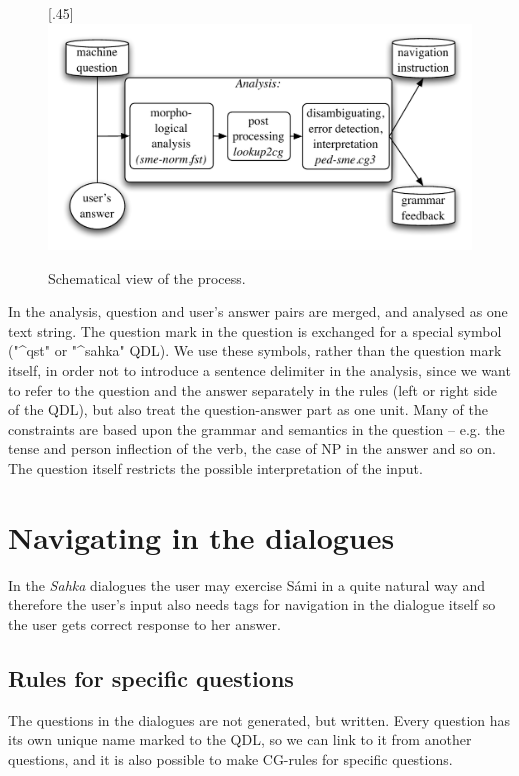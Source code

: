 \documentclass[11pt]{article}
\begin{document}
\begin{figure}[htbp]
\begin{center}
\scalebox{.45}[.45]{\includegraphics{presentation/img/qa2.pdf}}\\
\caption{Schematical view of the process.}
\end{center}
\end{figure}


In the analysis, question and user's answer pairs are merged, and analysed as one text string. The question mark in the question is exchanged for a special symbol ("\^{}qst" or "\^{}sahka" QDL). We use these symbols, rather than the question mark itself, in order not to introduce a sentence delimiter in the analysis, since we want to refer to the question and the answer separately in the rules (left or right side of the QDL), but also treat the question-answer part as one unit. Many of the constraints are based upon the grammar and semantics in the question -- e.g. the tense and person inflection of the verb, the case of NP in the answer and so on. The question itself restricts the possible interpretation of the input. \\




\section{Navigating in the dialogues}
In the \textit{Sahka} dialogues the user may exercise Sámi in a quite natural way and therefore the user's input also needs tags for navigation in the dialogue itself so the user gets correct response to her answer.

\subsection{Rules for specific questions}
The questions in the dialogues are not generated, but written. Every question has its own unique name marked to the QDL, so we can link to it from another questions, and it is also possible to make CG-rules for specific questions. \\ 
\end{document}
